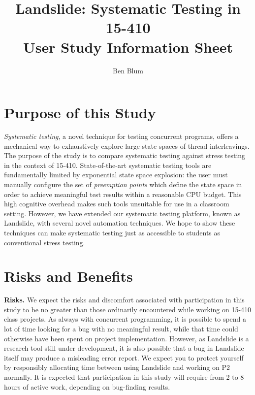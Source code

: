 \documentclass{article}
\begin{document}

\title{\bf Landslide: Systematic Testing in 15-410 \\ User Study Information Sheet}
\author{Ben Blum}
\date{}
\maketitle

\section{Purpose of this Study}

{\em Systematic testing}, a novel technique for testing concurrent programs, offers a mechanical way to exhaustively explore large state spaces of thread interleavings.
The purpose of the study is to compare systematic testing against stress testing in the context of 15-410.
State-of-the-art systematic testing tools are fundamentally limited by exponential state space explosion: the user must manually configure the set of {\em preemption points} which define the state space in order to achieve meaningful test results within a reasonable CPU budget.
This high cognitive overhead makes such tools unsuitable for use in a classroom setting.
However, we have extended our systematic testing platform, known as Landslide, with several novel automation techniques.
We hope to show these techniques can make systematic testing just as accessible to students as conventional stress testing.

\section{Risks and Benefits}

{\bf Risks.}
We expect the risks and discomfort associated with participation in this study to be no greater than those ordinarily encountered while working on 15-410 class projects.
As always with concurrent programming, it is possible to spend a lot of time looking for a bug with no meaningful result, while that time could otherwise have been spent on project implementation.
However, as Landslide is a research tool still under development, it is also possible that a bug in Landslide itself may produce a misleading error report. We expect you to protect yourself by responsibly allocating time between using Landslide and working on P2 normally. It is expected that participation in this study will require from 2 to 8 hours of active work, depending on bug-finding results.
\\
\end{document}
